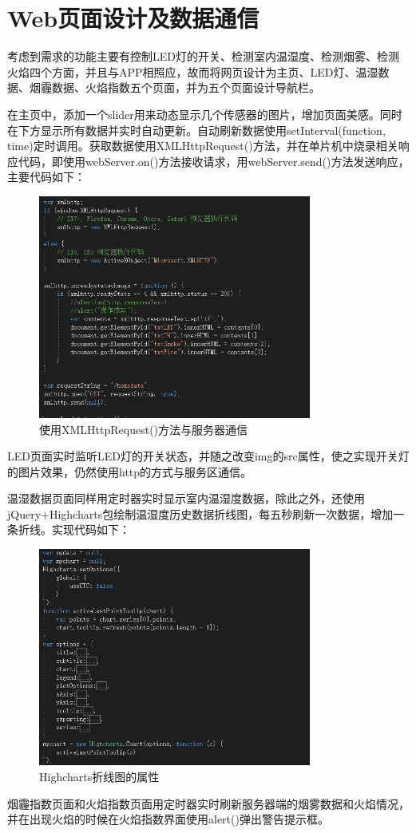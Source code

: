 \section{Web页面设计及数据通信}

考虑到需求的功能主要有控制LED灯的开关、检测室内温湿度、检测烟雾、检测火焰四个方面，并且与APP相照应，故而将网页设计为主页、LED灯、温湿数据、烟霾数据、火焰指数五个页面，并为五个页面设计导航栏。

在主页中，添加一个slider用来动态显示几个传感器的图片，增加页面美感。同时在下方显示所有数据并实时自动更新。自动刷新数据使用setInterval(function, time)定时调用。获取数据使用XMLHttpRequest()方法，并在单片机中烧录相关响应代码，即使用webServer.on()方法接收请求，用webServer.send()方法发送响应，主要代码如下：

\begin{figure}[htbp]
    \centering
    \includegraphics[width=0.8\textwidth]{figures/code/4}
    \caption{使用XMLHttpRequest()方法与服务器通信}
\end{figure}

LED页面实时监听LED灯的开关状态，并随之改变img的src属性，使之实现开关灯的图片效果，仍然使用http的方式与服务区通信。

温湿数据页面同样用定时器实时显示室内温湿度数据，除此之外，还使用jQuery+Highcharts包绘制温湿度历史数据折线图，每五秒刷新一次数据，增加一条折线。实现代码如下：

\begin{figure}[htbp]
    \centering
    \includegraphics[width=0.8\textwidth]{figures/code/5}
    \caption{Highcharts折线图的属性}
\end{figure}

烟霾指数页面和火焰指数页面用定时器实时刷新服务器端的烟雾数据和火焰情况，并在出现火焰的时候在火焰指数界面使用alert()弹出警告提示框。